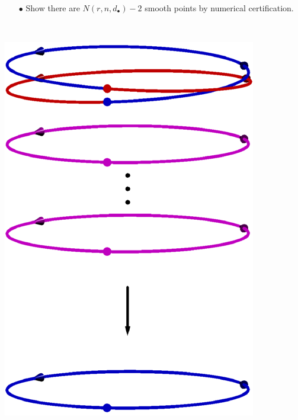 \documentclass{beamer}
\theoremstyle{definition}
\begin{document}
\begin{frame}
\begin{minipage}{.65\textwidth}
\begin{enumerate}
\item[$\bullet$] Show there are $N(r,n,d_\bullet)-2$ smooth points by numerical certification.
\end{enumerate}
\end{minipage}
%
\begin{minipage}{.01\textwidth}
~
\end{minipage}
%
\begin{minipage}{.3\textwidth}
\begin{center}
\includegraphics[scale=.5]{figures/Harris.pdf}
\end{center}
\end{minipage}


\end{frame}



\end{document}
